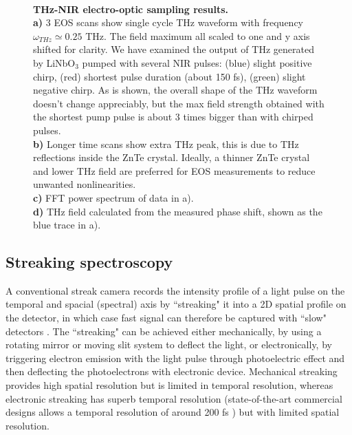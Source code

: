 \begin{figure}[H]
	
	\vspace{-0.5\baselineskip}
	\centering
	 \\
	\vspace{-0.5\baselineskip}
	\caption[THz-NIR electro-optic sampling results.]
	        {{\bf THz-NIR electro-optic sampling results.}\\
            {\bf a)} 3 EOS scans show single cycle THz waveform with frequency $\omega_{\scriptscriptstyle THz} \simeq 0.25$ THz. The field maximum all scaled to one and y axis shifted for clarity. We have examined the output of THz generated by LiNbO$_{3}$ pumped with several NIR pulses: (blue) slight positive chirp, (red) shortest pulse duration (about 150 fs), (green) slight negative chirp. As is shown, the overall shape of the THz waveform doesn't change appreciably, but the max field strength obtained with the shortest pump pulse is about 3 times bigger than with chirped pulses. \\
            {\bf b)} Longer time scans show extra THz peak, this is due to THz reflections inside the ZnTe crystal. Ideally, a thinner ZnTe crystal and lower THz field are preferred for EOS measurements to reduce unwanted nonlinearities.\\
            {\bf c)} FFT power spectrum of data in a).\\
            {\bf d)} THz field calculated from the measured phase shift, shown as the blue trace in a).}
    \label{fig:EOSresult}
    \vspace{-0.5\baselineskip}
    
\end{figure}


\subsection{Streaking spectroscopy}
A conventional streak camera records the intensity profile of a light pulse on the temporal and spacial (spectral) axis by ``streaking" it into a 2D spatial profile on the detector, in which case fast signal can therefore be captured with ``slow" detectors \cite{GuideStreakCamera}. The ``streaking" can be achieved either mechanically, by using a rotating mirror or moving slit system to deflect the light, or electronically, by triggering electron emission with the light pulse through photoelectric effect and then deflecting the photoelectrons with electronic device. Mechanical streaking provides high spatial resolution but is limited in temporal resolution, whereas electronic streaking has superb temporal resolution (state-of-the-art commercial designs allows a temporal resolution of around 200 fs \cite{fsStreakcamera}) but with limited spatial resolution. 

